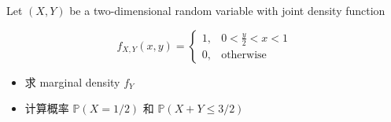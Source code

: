 \documentclass{qlnotes-export}
\begin{document}
\begin{example}\label{ex-03-joint-conditional-distribution-example-002}

Let \((X,Y)\) be a two-dimensional random variable with joint density function

\[f_{X,Y}(x,y) = \left\{ \begin{matrix}
{1,} & {0 < \frac{y}{2} < x < 1} \\
{0,} & \text{otherwise}
\end{matrix} \right.\]

\begin{itemize}
\item
  求 marginal density \(f_{Y}\)
\item
  计算概率 \({\mathbb{P}}(X = 1/2)\) 和 \({\mathbb{P}}(X + Y \leq 3/2)\)
\end{itemize}

\end{example}
\end{document}
